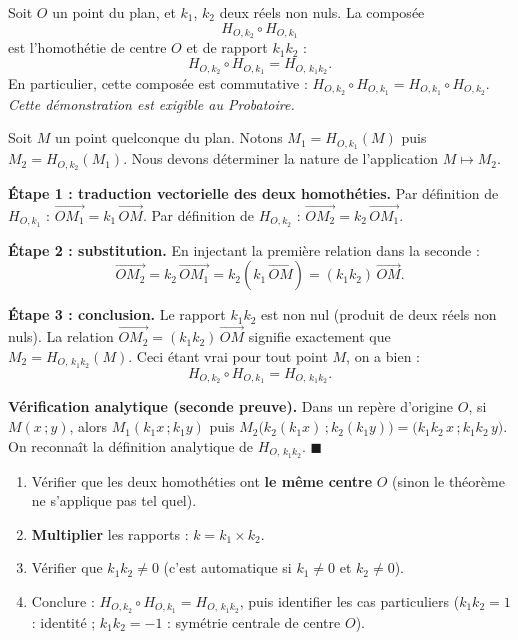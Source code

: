 \documentclass[11pt]{article}
\newcounter{popsec}
\newcounter{popsub}
\newcommand{\courssub}[1]{%
  \stepcounter{popsub}%
  \par\vspace{9pt}\noindent{\popxbold\fontsize{11.5}{13}\selectfont\color{popink}{\color{poporange}\thepopsec.\thepopsub}\hspace{6pt}#1}\par\nopagebreak\vspace{4pt}
}
\begin{document}
\courssub{Théorème fondamental}

\begin{propriete}
Soit $O$ un point du plan, et $k_1$, $k_2$ deux réels non nuls. La composée
\[
H_{O,k_2} \circ H_{O,k_1}
\]
est l'homothétie de centre $O$ et de rapport $k_1 k_2$ :
\[
H_{O,k_2} \circ H_{O,k_1} = H_{O,\,k_1 k_2}.
\]
En particulier, cette composée est commutative : $H_{O,k_2} \circ H_{O,k_1} = H_{O,k_1} \circ H_{O,k_2}$. \emph{Cette démonstration est exigible au Probatoire.}
\end{propriete}

\begin{experience}
Soit $M$ un point quelconque du plan. Notons $M_1 = H_{O,k_1}(M)$ puis $M_2 = H_{O,k_2}(M_1)$. Nous devons déterminer la nature de l'application $M \mapsto M_2$.

\textbf{Étape 1 : traduction vectorielle des deux homothéties.}
Par définition de $H_{O,k_1}$ : $\overrightarrow{OM_1} = k_1\,\overrightarrow{OM}$.
Par définition de $H_{O,k_2}$ : $\overrightarrow{OM_2} = k_2\,\overrightarrow{OM_1}$.

\textbf{Étape 2 : substitution.}
En injectant la première relation dans la seconde :
\[
\overrightarrow{OM_2} = k_2\,\overrightarrow{OM_1} = k_2\left(k_1\,\overrightarrow{OM}\right) = (k_1 k_2)\,\overrightarrow{OM}.
\]

\textbf{Étape 3 : conclusion.}
Le rapport $k_1 k_2$ est non nul (produit de deux réels non nuls). La relation $\overrightarrow{OM_2} = (k_1 k_2)\,\overrightarrow{OM}$ signifie exactement que $M_2 = H_{O,\,k_1 k_2}(M)$. Ceci étant vrai pour tout point $M$, on a bien :
\[
H_{O,k_2} \circ H_{O,k_1} = H_{O,\,k_1 k_2}.
\]

\textbf{Vérification analytique (seconde preuve).} Dans un repère d'origine $O$, si $M(x\,;y)$, alors $M_1(k_1 x\,; k_1 y)$ puis $M_2\big(k_2(k_1 x)\,; k_2(k_1 y)\big) = \big(k_1 k_2\, x\,; k_1 k_2\, y\big)$. On reconnaît la définition analytique de $H_{O,\,k_1 k_2}$. $\blacksquare$
\end{experience}

\begin{methode}
\begin{enumerate}
\item Vérifier que les deux homothéties ont \textbf{le même centre} $O$ (sinon le théorème ne s'applique pas tel quel).
\item \textbf{Multiplier} les rapports : $k = k_1 \times k_2$.
\item Vérifier que $k_1 k_2 \neq 0$ (c'est automatique si $k_1 \neq 0$ et $k_2 \neq 0$).
\item Conclure : $H_{O,k_2} \circ H_{O,k_1} = H_{O,\,k_1 k_2}$, puis identifier les cas particuliers ($k_1k_2 = 1$ : identité ; $k_1k_2 = -1$ : symétrie centrale de centre $O$).
\end{enumerate}
\end{methode}
\end{document}
